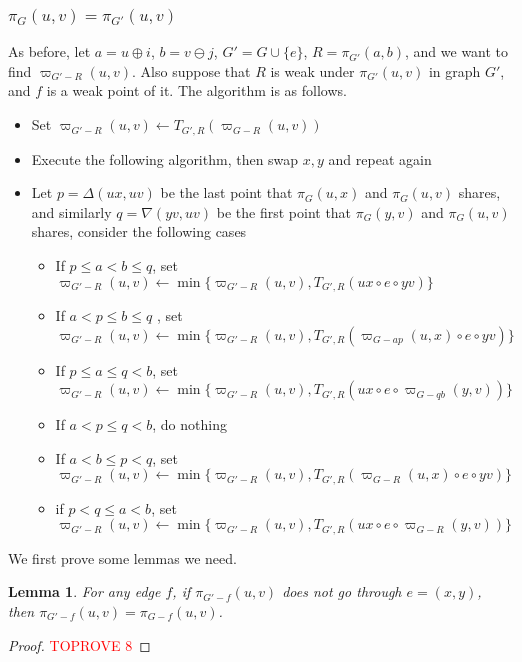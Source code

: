 \documentclass[11pt]{article}
\theoremstyle{plain}
\newtheorem{lemma}[theorem]{Lemma}
\theoremstyle{definition}
\newcommand{\new}[1]{\pi_{G'}(#1)}
\newcommand{\og}[3]{\pi_{G-#3}\left(#1,#2\right)}
\newcommand{\nng}[3]{\pi_{G'-#3}\left(#1,#2\right)}
\newcommand{\odg}[3]{\varpi_{G-#3}\left(#1,#2\right)}
\newcommand{\ndg}[3]{\varpi_{G'-#3}\left(#1,#2\right)}
\newcommand{\pp}[1]{T_{G',R}\left(#1\right)}
\begin{document}
\subsubsection{$\pi_G(u,v)=\pi_{G'}(u,v)$}\label{sec3-3-2}

As before, let $a = u \oplus i$, $b = v \ominus j$,  $G'=G\cup\{e\}$, $R=\new{a, b}$, and we want to find $\ndg{u}{v}{R}$. Also suppose that $R$ is weak under $\pi_{G'}(u,v)$ in graph $G'$, and $f$ is a weak point of it. The algorithm is as follows.





\begin{itemize}
    \item Set $\ndg{u}{v}{R}\leftarrow \pp{\odg{u}{v}{R}}$
    \item Execute the following algorithm, then swap $x,y$ and repeat again
    \item Let $p=\Delta(ux,uv)$ be the last point that $\pi_G(u,x)$ and $\pi_G(u,v)$ shares, and similarly $q=\nabla(yv,uv)$ be the first point that $\pi_G(y,v)$ and $\pi_G(u,v)$ shares, consider the following cases
    \begin{itemize}
        \item If $p\le a<b\le q$, set $\ndg{u}{v}{R}\leftarrow\min\{\ndg{u}{v}{R},\pp{ux\circ e\circ yv}\}$
        \item If $a<p\le b\le q$ , set $\ndg{u}{v}{R}\leftarrow\min\{\ndg{u}{v}{R},\pp{\odg{u}{x}{ap}\circ e\circ yv}\}$
        \item If $p\le a\le q< b$, set $\ndg{u}{v}{R}\leftarrow\min\{\ndg{u}{v}{R},\pp{ux\circ e\circ \odg{y}{v}{qb}}\}$
        \item If $a<p\le q<b$, do nothing
        \item If $a<b\le p<q$, set $\ndg{u}{v}{R}\leftarrow\min\{\ndg{u}{v}{R},\pp{\odg{u}{x}{R}\circ e\circ yv}\}$
        \item if $p<q\le a<b$, set $\ndg{u}{v}{R}\leftarrow\min\{\ndg{u}{v}{R},\pp{ux\circ e\circ\odg{y}{v}{R}}\}$
    \end{itemize}
\end{itemize}

We first prove some lemmas we need.
\begin{lemma}\label{lemma4-5}
    For any edge $f$, if $\nng{u}{v}{f}$ does not go through $e=(x,y)$, then $\nng{u}{v}{f}=\og{u}{v}{f}$.
\end{lemma}

\begin{proof}\textcolor{red}{TOPROVE 8}\end{proof}
\end{document}
